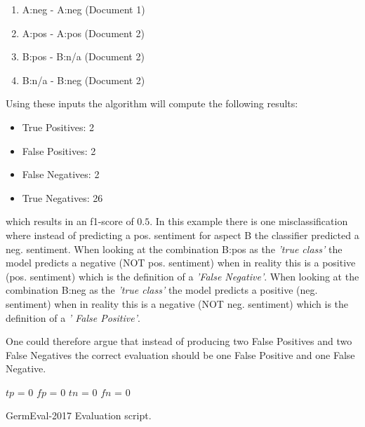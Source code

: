 \begin{enumerate}
	\item A:neg - A:neg (Document 1)
	\item A:pos - A:pos (Document 2)
	\item B:pos - B:n/a (Document 2)
	\item B:n/a - B:neg (Document 2)
\end{enumerate}

Using these inputs the algorithm will compute the following results:

\begin{itemize}
	\item True Positives: 2
	\item False Positives: 2
	\item False Negatives: 2
	\item True Negatives: 26
\end{itemize}

which results in an f1-score of $0.5$. In this example there is one misclassification where instead of predicting a pos. sentiment for aspect B the classifier predicted a neg. sentiment. When looking at the combination B:pos as the \textit{'true class'} the model predicts a negative {(NOT pos. sentiment)} when in reality this is a positive {(pos. sentiment)} which is the definition of a \textit{'False Negative'}. When looking at the combination B:neg as the \textit{'true class'} the model predicts a positive {(neg. sentiment)} when in reality this is a negative {(NOT neg. sentiment)} which is the definition of a \textit{' False Positive'}.

One could therefore argue that instead of producing two False Positives and two False Negatives the correct evaluation should be one False Positive and one False Negative.


\begin{algorithm}
	
	
	
	$tp$ = 0
	$fp$ = 0
	$tn$ = 0	
	$fn$ = 0
	
	
	
	\caption{GermEval-2017 Evaluation script.}
	\label{algo:05_germeval}
\end{algorithm}



